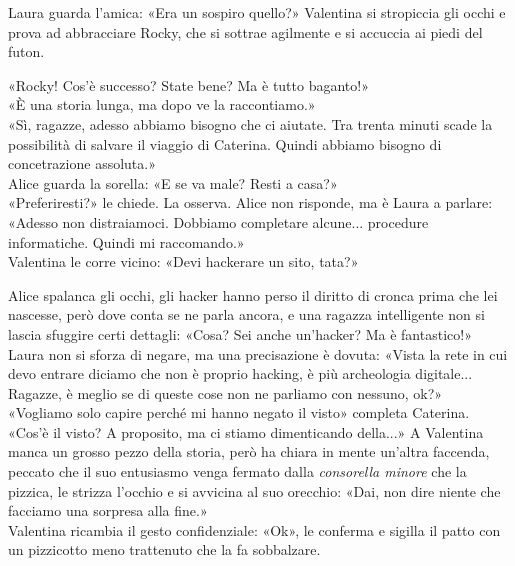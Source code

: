 \documentclass[10pt,oneside]{extbook}
\begin{document}
Laura guarda l’amica: «Era un sospiro quello?»
Valentina si stropiccia gli occhi e prova ad abbracciare Rocky, che si sottrae agilmente e si accuccia ai piedi del futon.

\par\medskip
«Rocky! Cos'\`e successo? State bene? Ma \`e tutto baganto!»\\
«\`E una storia lunga, ma dopo ve la raccontiamo.»\\
«Sì, ragazze, adesso abbiamo bisogno che ci aiutate. Tra trenta minuti scade la possibilità di salvare il viaggio di Caterina. Quindi abbiamo bisogno di concetrazione assoluta.»\\

Alice guarda la sorella: «E se va male? Resti a casa?»\\
«Preferiresti?» le chiede. La osserva. Alice non risponde, ma \`e Laura a parlare: «Adesso non distraiamoci. Dobbiamo completare alcune... procedure informatiche. Quindi mi raccomando.»\\
Valentina le corre vicino: «Devi hackerare un sito, tata?»

\par\medskip
Alice spalanca gli occhi, gli hacker hanno perso il diritto di cronca prima che lei nascesse, per\`o dove conta se ne parla ancora, e una ragazza intelligente non si lascia sfuggire certi dettagli: «Cosa? Sei anche un'hacker? Ma \`e fantastico!»\\
Laura non si sforza di negare, ma una precisazione \`e dovuta:
«Vista la rete in cui devo entrare diciamo che non \`e proprio hacking, \`e pi\`u archeologia digitale... Ragazze, \`e meglio se di queste cose non ne parliamo con nessuno, ok?»\\
«Vogliamo solo capire perch\'e mi hanno negato il visto» completa Caterina.\\
«Cos’\`e il visto? A proposito, ma ci stiamo dimenticando della...» A Valentina manca un grosso pezzo della storia, per\`o ha chiara in mente un'altra faccenda, peccato che il suo entusiasmo venga fermato dalla \textit{consorella minore} che la pizzica, le strizza l’occhio e si avvicina al suo orecchio: «Dai, non dire niente che facciamo una sorpresa alla fine.»\\
Valentina ricambia il gesto confidenziale: «Ok», le conferma e sigilla il patto con un pizzicotto meno trattenuto che la fa sobbalzare.
\end{document}
